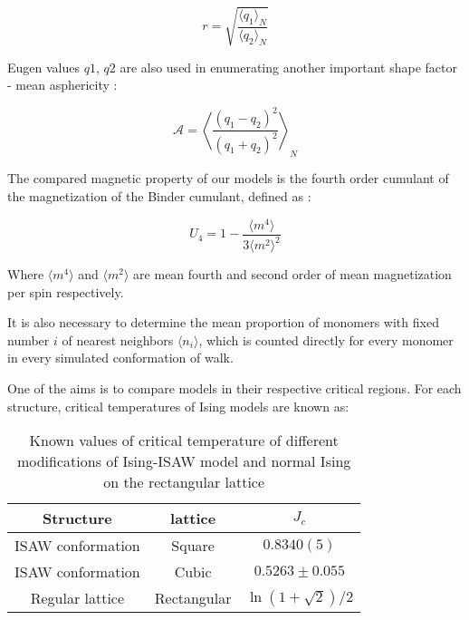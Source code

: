 \begin{equation}
    r = \sqrt{\frac{\langle q_{1}\rangle_{N}}{\langle q_{2} \rangle_{N}}}
\end{equation}

Eugen values $q1$, $q2$ are also used in enumerating another important shape factor - mean asphericity \cite{Caracciolo2011}:

\begin{equation}
\label{eq:Asphericity}
    \mathcal{A} = \left\langle \frac{(q_{1} - q_{2})^{2}}{(q_{1} + q_{2})^{2}} \right\rangle_{N}
\end{equation}

The compared magnetic property of our models is the fourth order cumulant of the magnetization of the Binder cumulant, defined as \cite{Binder1981_Ising}:

\begin{equation}
\label{eq:Cumulant}
U_{4} = 1 - \frac{\langle m^{4} \rangle}{3 \langle m^{2} \rangle^{2}}
\end{equation}

Where $\langle m^{4} \rangle$ and $\langle m^{2} \rangle$ are mean fourth and second order of mean magnetization per spin respectively.

It is also necessary to determine the mean proportion of monomers with fixed number $i$ of nearest neighbors $\langle n_{i} \rangle$, which is counted directly for every monomer in every simulated conformation of walk.

One of the aims is to compare models in their respective critical regions. For each structure, critical temperatures of Ising models are known as:

\begin{table}[h]
    \centering
    \begin{tabular}{|c|c|c|}
        \hline
        Structure & lattice & $J_{c}$ \\ \hline
        ISAW conformation & Square & $0.8340(5)$\cite{faizullina2021critical} \\ \hline
        ISAW conformation & Cubic & $0.5263 \pm 0.055$\cite{Foster2021}\\ \hline
        Regular lattice & Rectangular & $\ln{(1 + \sqrt{2}) / 2}$\cite{Onsager}\\ \hline
    \end{tabular}
    \label{tab:Ising_T_c}
    \medskip
    \caption{Known values of critical temperature of different modifications of Ising-ISAW model and normal Ising on the rectangular lattice}
\end{table}


